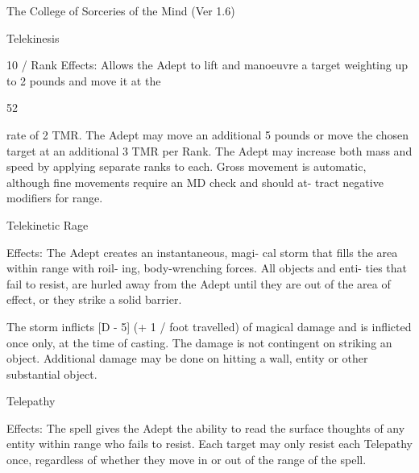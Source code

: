 \begin{Chapter}{The College of Sorceries of the Mind (Ver 1.6)}
\begin{spell}[S-7]{Telekinesis }

10 / Rank 
Effects:  Allows  the  Adept  to  lift  and  manoeuvre  a 
target weighting up to 2 pounds and move it at the 

52 

rate of 2 TMR. The Adept may move an additional 
5 pounds or move the chosen target at an additional 
3  TMR  per  Rank.  The  Adept  may  increase  both 
mass and speed by applying separate ranks to each. 
Gross  movement 
is  automatic,  although  fine 
movements  require  an  MD  check  and  should  at-
tract negative modifiers for range. 

\end{spell}

\begin{spell}[S-8]{Telekinetic Rage }

Effects: The Adept creates an instantaneous, magi-
cal storm that fills the area  within range  with roil-
ing,  body-wrenching  forces.  All  objects  and  enti-
ties  that  fail  to  resist,  are  hurled  away  from  the 
Adept  until  they  are  out  of  the  area  of  effect,  or 
they strike a solid barrier. 

The  storm  inflicts  [D  -  5]  (+  1  /  foot  travelled)  of 
magical  damage  and  is  inflicted  once  only,  at  the 
time  of  casting.  The  damage  is  not  contingent  on 
striking an object. Additional damage may be done 
on hitting a wall, entity or other substantial object. 

\end{spell}

\begin{spell}[S-9]{Telepathy }

Effects:  The  spell  gives  the  Adept  the  ability  to 
read the surface thoughts of any entity within range 
who fails to resist. Each target may only resist each 
Telepathy  once,  regardless  of  whether  they  move 
in or out of the range of the spell. 


\end{spell}
\end{Chapter}
